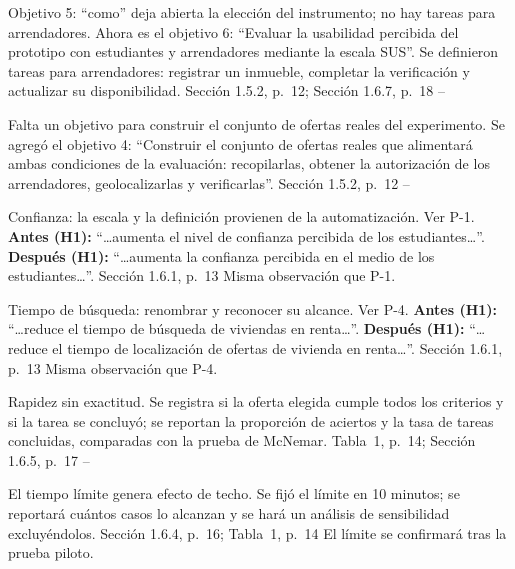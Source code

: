 \documentclass[10pt]{article}
\begin{document}
\begin{matriz}
  {Objetivo 5: ``como'' deja abierta la elección del instrumento; no hay tareas para arrendadores.}
  {Ahora es el objetivo 6: ``Evaluar la usabilidad percibida del prototipo con estudiantes y arrendadores mediante la escala SUS''.\newline
   Se definieron tareas para arrendadores: registrar un inmueble, completar la verificación y actualizar su disponibilidad.}
  {Sección 1.5.2, p.~12; Sección 1.6.7, p.~18}
  {\Atendida}{--}{}

  {Falta un objetivo para construir el conjunto de ofertas reales del experimento.}
  {Se agregó el objetivo 4: ``Construir el conjunto de ofertas reales que alimentará ambas condiciones de la evaluación: recopilarlas, obtener la autorización de los arrendadores, geolocalizarlas y verificarlas''.}
  {Sección 1.5.2, p.~12}
  {\Atendida}{--}{}

  {Confianza: la escala y la definición provienen de la automatización.}
  {Ver P-1.\newline
   \textbf{Antes (H1):} ``\ldots aumenta el nivel de confianza percibida de los estudiantes\ldots''.\newline
   \textbf{Después (H1):} ``\ldots aumenta la confianza percibida en el medio de los estudiantes\ldots''.}
  {Sección 1.6.1, p.~13}
  {\Atendida}{Misma observación que P-1.}{}

  {Tiempo de búsqueda: renombrar y reconocer su alcance.}
  {Ver P-4.\newline
   \textbf{Antes (H1):} ``\ldots reduce el tiempo de búsqueda de viviendas en renta\ldots''.\newline
   \textbf{Después (H1):} ``\ldots reduce el tiempo de localización de ofertas de vivienda en renta\ldots''.}
  {Sección 1.6.1, p.~13}
  {\Atendida}{Misma observación que P-4.}{}

  {Rapidez sin exactitud.}
  {Se registra si la oferta elegida cumple todos los criterios y si la tarea se concluyó; se reportan la proporción de aciertos y la tasa de tareas concluidas, comparadas con la prueba de McNemar.}
  {Tabla~1, p.~14; Sección 1.6.5, p.~17}
  {\Atendida}{--}{}

  {El tiempo límite genera efecto de techo.}
  {Se fijó el límite en 10 minutos; se reportará cuántos casos lo alcanzan y se hará un análisis de sensibilidad excluyéndolos.}
  {Sección 1.6.4, p.~16; Tabla~1, p.~14}
  {\Atendida}{El límite se confirmará tras la prueba piloto.}{}


\end{matriz}
\end{document}
